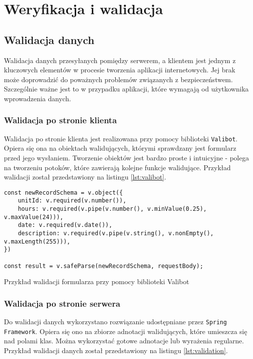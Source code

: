 \chapter{Weryfikacja i walidacja}
\label{ch:06}

\section{Walidacja danych}

Walidacja danych przesyłanych pomiędzy serwerem, a klientem jest jednym z kluczowych elementów w procesie tworzenia aplikacji internetowych. Jej brak może doprowadzić do poważnych problemów związanych z bezpieczeństwem. Szczególnie ważne jest to w przypadku aplikacji, które wymagają od użytkownika wprowadzenia danych.

\subsection{Walidacja po stronie klienta}

Walidacja po stronie klienta jest realizowana przy pomocy biblioteki \texttt{Valibot}. Opiera się ona na obiektach walidujących, którymi sprawdzany jest formularz przed jego wysłaniem. Tworzenie obiektów jest bardzo proste i intuicyjne - polega na tworzeniu potoków, które zawierają kolejne funkcje walidujące. Przykład walidacji został przedstawiony na listingu \ref{lst:valibot}.

\begin{listing}[H]
    \begin{verbatim}
const newRecordSchema = v.object({
    unitId: v.required(v.number()),
    hours: v.required(v.pipe(v.number(), v.minValue(0.25), v.maxValue(24))),
    date: v.required(v.date()),
    description: v.required(v.pipe(v.string(), v.nonEmpty(), v.maxLength(255))),
})

const result = v.safeParse(newRecordSchema, requestBody);
    \end{verbatim}
    \caption{Przykład walidacji formularza przy pomocy biblioteki Valibot}
    \label{lst:valibot}
\end{listing}

\subsection{Walidacja po stronie serwera}

Do walidacji danych wykorzystano rozwiązanie udostępniane przez \texttt{Spring Framework}. Opiera się ono na zbiorze adnotacji walidujących, które umieszcza się nad polami klas. Można wykorzystać gotowe adnotacje lub wyrażenia regularne. Przykład walidacji danych został przedstawiony na listingu \ref{lst:validation}.

